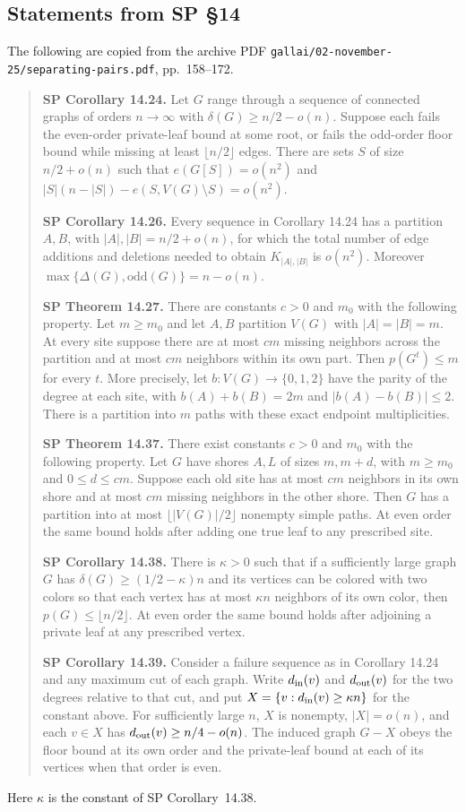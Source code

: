 \documentclass[11pt]{article}
\theoremstyle{definition}
\newcommand{\odd}{\mathrm{odd}}
\begin{document}
\subsection{Statements from SP \S14}
The following are copied from the archive PDF \texttt{gallai/02-november-25/separating-pairs.pdf}, pp.~158--172.

\begin{quote}
\textbf{SP Corollary 14.24.} Let $G$ range through a sequence of connected graphs of orders $n\to\infty$ with $\delta(G)\ge n/2-o(n)$. Suppose each fails the even-order private-leaf bound at some root, or fails the odd-order floor bound while missing at least $\lfloor n/2\rfloor$ edges. There are sets $S$ of size $n/2+o(n)$ such that $e(G[S])=o(n^2)$ and $|S|(n-|S|)-e(S,V(G)\setminus S)=o(n^2)$.

\textbf{SP Corollary 14.26.} Every sequence in Corollary 14.24 has a partition $A,B$, with $|A|,|B|=n/2+o(n)$, for which the total number of edge additions and deletions needed to obtain $K_{|A|,|B|}$ is $o(n^2)$. Moreover $\max\{\Delta(G),\odd(G)\}=n-o(n)$.

\textbf{SP Theorem 14.27.} There are constants $c>0$ and $m_0$ with the following property. Let $m\ge m_0$ and let $A,B$ partition $V(G)$ with $|A|=|B|=m$. At every site suppose there are at most $cm$ missing neighbors across the partition and at most $cm$ neighbors within its own part. Then $p(G^t)\le m$ for every $t$. More precisely, let $b:V(G)\to\{0,1,2\}$ have the parity of the degree at each site, with $b(A)+b(B)=2m$ and $|b(A)-b(B)|\le 2$. There is a partition into $m$ paths with these exact endpoint multiplicities.

\textbf{SP Theorem 14.37.} There exist constants $c>0$ and $m_0$ with the following property. Let $G$ have shores $A,L$ of sizes $m,m+d$, with $m\ge m_0$ and $0\le d\le cm$. Suppose each old site has at most $cm$ neighbors in its own shore and at most $cm$ missing neighbors in the other shore. Then $G$ has a partition into at most $\lfloor|V(G)|/2\rfloor$ nonempty simple paths. At even order the same bound holds after adding one true leaf to any prescribed site.

\textbf{SP Corollary 14.38.} There is $\kappa>0$ such that if a sufficiently large graph $G$ has $\delta(G)\ge(1/2-\kappa)n$ and its vertices can be colored with two colors so that each vertex has at most $\kappa n$ neighbors of its own color, then $p(G)\le\lfloor n/2\rfloor$. At even order the same bound holds after adjoining a private leaf at any prescribed vertex.

\textbf{SP Corollary 14.39.} Consider a failure sequence as in Corollary 14.24 and any maximum cut of each graph. Write $d_{\rm in}(v)$ and $d_{\rm out}(v)$ for the two degrees relative to that cut, and put $X=\{v:d_{\rm in}(v)\ge\kappa n\}$ for the constant above. For sufficiently large $n$, $X$ is nonempty, $|X|=o(n)$, and each $v\in X$ has $d_{\rm out}(v)\ge n/4-o(n)$. The induced graph $G-X$ obeys the floor bound at its own order and the private-leaf bound at each of its vertices when that order is even.
\end{quote}
Here $\kappa$ is the constant of SP Corollary~14.38.
\end{document}
